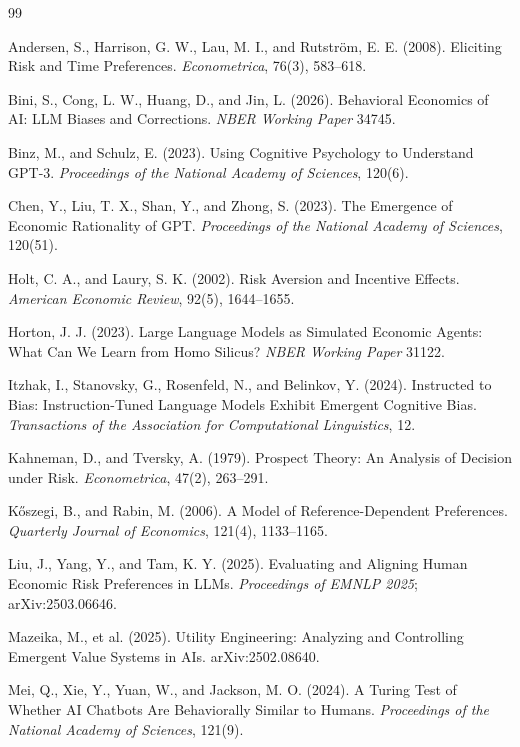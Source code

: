 \documentclass[11pt]{article}
\begin{document}
\begin{thebibliography}{99}
\small

Andersen, S., Harrison, G. W., Lau, M. I., and Rutstr\"om, E. E. (2008).
Eliciting Risk and Time Preferences. \textit{Econometrica}, 76(3), 583--618.

Bini, S., Cong, L. W., Huang, D., and Jin, L. (2026).
Behavioral Economics of AI: LLM Biases and Corrections. \textit{NBER Working Paper} 34745.

Binz, M., and Schulz, E. (2023).
Using Cognitive Psychology to Understand GPT-3. \textit{Proceedings of the National Academy of Sciences}, 120(6).

Chen, Y., Liu, T. X., Shan, Y., and Zhong, S. (2023).
The Emergence of Economic Rationality of GPT. \textit{Proceedings of the National Academy of Sciences}, 120(51).

Holt, C. A., and Laury, S. K. (2002).
Risk Aversion and Incentive Effects. \textit{American Economic Review}, 92(5), 1644--1655.

Horton, J. J. (2023).
Large Language Models as Simulated Economic Agents: What Can We Learn from Homo Silicus?
\textit{NBER Working Paper} 31122.

Itzhak, I., Stanovsky, G., Rosenfeld, N., and Belinkov, Y. (2024).
Instructed to Bias: Instruction-Tuned Language Models Exhibit Emergent Cognitive Bias.
\textit{Transactions of the Association for Computational Linguistics}, 12.

Kahneman, D., and Tversky, A. (1979).
Prospect Theory: An Analysis of Decision under Risk. \textit{Econometrica}, 47(2), 263--291.

K\H{o}szegi, B., and Rabin, M. (2006).
A Model of Reference-Dependent Preferences. \textit{Quarterly Journal of Economics}, 121(4), 1133--1165.

Liu, J., Yang, Y., and Tam, K. Y. (2025).
Evaluating and Aligning Human Economic Risk Preferences in LLMs.
\textit{Proceedings of EMNLP 2025}; arXiv:2503.06646.

Mazeika, M., et al. (2025).
Utility Engineering: Analyzing and Controlling Emergent Value Systems in AIs. arXiv:2502.08640.

Mei, Q., Xie, Y., Yuan, W., and Jackson, M. O. (2024).
A Turing Test of Whether AI Chatbots Are Behaviorally Similar to Humans.
\textit{Proceedings of the National Academy of Sciences}, 121(9).


\end{thebibliography}
\end{document}
